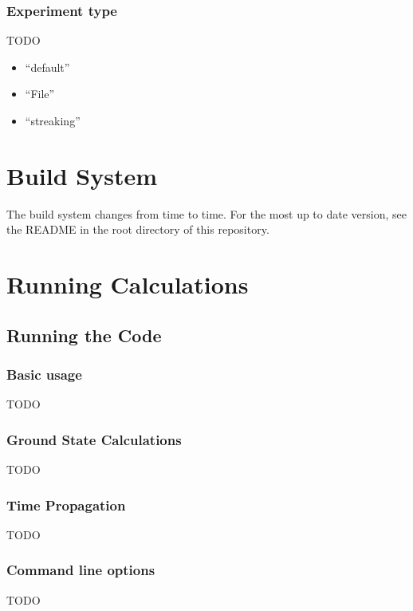 \documentclass{article}
\begin{document}
\subsubsection{Experiment type} %
\label{ssub:experiment_type}
TODO
\begin{itemize}
  \item ``default''
  \item ``File''
  \item ``streaking''
\end{itemize}



\section{Build System} %
\label{sec:build_system}
The build system changes from time to time. For the most up to date version, see the README in the root directory of this repository.

\section{Running Calculations} %
\label{sec:running_tdse_and_best_practices}
\subsection{Running the Code} %
\label{sub:running_the_code}
\subsubsection{Basic usage} %
\label{ssub:basic_usage}
TODO

\subsubsection{Ground State Calculations} %
\label{ssub:ground_state_calculations}
TODO

\subsubsection{Time Propagation} %
\label{ssub:time_propagation}
TODO

\subsubsection{Command line options} %
\label{ssub:command_line_options}
TODO
\end{document}
